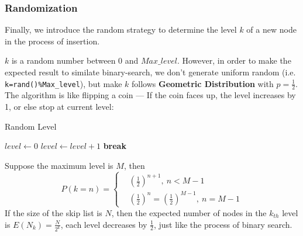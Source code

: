 \subsubsection{Randomization}
Finally, we introduce the random strategy to determine the level $k$ of a new node in the process of insertion.\par
$k$ is a random number between $0$ and $Max\_level$. However, in order to make the expected result to similate binary-search, we don't generate uniform random (i.e. \texttt{k=rand()\%Max\_level}), but make $k$ follows \textbf{Geometric Distribution} with $p = \frac 1 2$. The algorithm is like flipping a coin --- If the coin faces up, the level increases by 1, or else stop at current level:
\begin{algorithm}[H]
    \caption{Random Level}\label{alg:rand}
    \begin{algorithmic}[1]
            \State $level \gets 0$
                    \State $level \gets level + 1$
                \Else
                    \State \textbf{break}
                \EndIf
            \EndWhile
            \State{}
		\EndProcedure
	\end{algorithmic}
\end{algorithm}
Suppose the maximum level is $M$, then
\[
    P(k=n)=\left\{
        \begin{aligned}
            &(\frac 1 2)^{n+1},\ n < M-1\\
            &(\frac 1 2)^{n}=(\frac 1 2)^{M-1},\ n = M-1
        \end{aligned}
        \right.
\]
If the size of the skip list is $N$, then the expected number of nodes in the $k_{th}$ level is $E(N_k) = \frac{N}{2^k}$, each level decreases by $\frac 1 2$, just like the process of binary search.